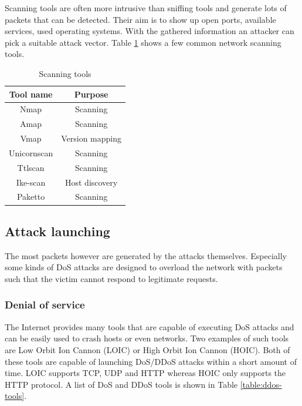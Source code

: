 \documentclass[conference]{IEEEtran}
\begin{document}
Scanning tools are often more intrusive than sniffing tools and generate lots of packets that can be detected. Their aim is to show up open ports, available services, used operating systems. With the gathered information an attacker can pick a suitable attack vector.
Table \ref{table:scanning-tools} shows a few common network scanning tools. 

\begin{table}[htbp]
\caption{Scanning tools \cite{b1}} 
\centering
\begin{tabular}{ | c | c | }
\hline
Tool name & Purpose \\
\hline
Nmap & Scanning	 \\
Amap & Scanning \\
Vmap & Version mapping \\
Unicornscan & Scanning \\
Ttlscan & Scanning \\
Ike-scan & Host discovery \\
Paketto & Scanning \\
\hline
\end{tabular}
\label{table:scanning-tools}
\end{table}

\subsection{Attack launching}
The most packets however are generated by the attacks themselves.
Especially some kinds of DoS attacks are designed to overload the network with packets such that the victim cannot respond to legitimate requests. 

\subsubsection{Denial of service}
The Internet provides many tools that are capable of executing DoS attacks and can be easily used to crash hosts or even networks.
Two examples of such tools are Low Orbit Ion Cannon (LOIC) or High Orbit Ion Cannon (HOIC). Both of these tools are capable of launching DoS/DDoS attacks within a short amount of time.
LOIC supports TCP, UDP and HTTP whereas HOIC only supports the HTTP protocol\cite{b1}. A list of DoS and DDoS tools is shown in Table \ref{table:ddos-tools}.
\end{document}
